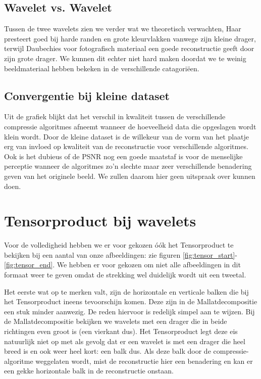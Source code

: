 \subsection{Wavelet vs. Wavelet}
Tussen de twee wavelets zien we verder wat we theoretisch verwachten, Haar presteert goed bij harde randen en grote kleurvlakken
vanwege zijn kleine drager, terwijl Daubechies voor fotografisch materiaal een goede reconstructie geeft door zijn grote drager.
We kunnen dit echter niet hard maken doordat we te weinig beeldmateriaal hebben bekeken in de verschillende catagori\"een. 

\subsection{Convergentie bij kleine dataset}
Uit de grafiek blijkt dat het verschil in kwaliteit tussen de verschillende compressie algoritmes afneemt wanneer
de hoeveelheid data die opgeslagen wordt klein wordt. 
Door de kleine dataset is de willekeur van de vorm van het plaatje erg van invloed op kwaliteit van de reconstructie 
voor verschillende algoritmes. 
Ook is het dubieus of de PSNR nog een goede maatstaf is voor de menselijke perceptie wanneer de algoritmes
zo'n slechte maar zeer verschillende benadering geven van het originele beeld.
We zullen daarom hier geen uitspraak over kunnen doen.

\section{Tensorproduct bij wavelets}
Voor de volledigheid hebben we er voor gekozen \'o\'ok het Tensorproduct te bekijken bij een aantal van onze afbeeldingen: zie figuren \ref{fig:tensor_start}-\ref{fig:tensor_end}. We hebben er voor gekozen om niet alle afbeeldingen in dit formaat weer te geven omdat de strekking wel duidelijk wordt uit een tweetal.

Het eerste wat op te merken valt, zijn de horizontale en verticale balken die bij het Tensorproduct ineens tevoorschijn komen. Deze zijn in de Mallatdecompositie een stuk minder aanwezig. De reden hiervoor is redelijk simpel aan te wijzen. Bij de Mallatdecompositie bekijken we wavelets met een drager die in beide richtingen even groot is (een vierkant dus). Het Tensorproduct legt deze eis natuurlijk niet op met als gevolg dat er een wavelet is met een drager die heel breed is en ook weer heel kort: een balk dus. Als deze balk door de compressie-algoritme weggelaten wordt, mist de reconstructie hier een benadering en kan er een gekke horizontale balk in de reconstructie onstaan.

